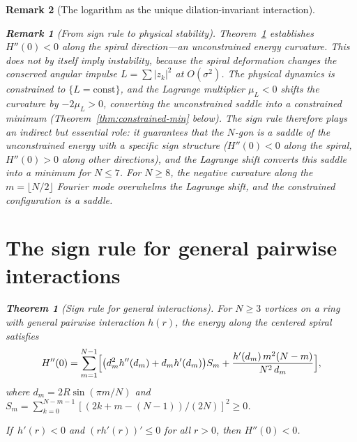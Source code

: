 \documentclass[12pt, a4paper]{article}
\newtheorem{theorem}{Theorem}[section]
\newtheorem{remark}{Remark}[section]
\numberwithin{equation}{section}
\begin{document}
\begin{remark}[The logarithm as the unique dilation-invariant interaction]
\begin{remark}[From sign rule to physical stability]
\label{rem:signrule-to-stability}
Theorem~\ref{thm:sign-rule} establishes $H''(0) < 0$ along the spiral
direction---an \emph{unconstrained} energy curvature.  This does not by
itself imply instability, because the spiral deformation changes the
conserved angular impulse $L = \sum|z_k|^2$ at $O(\sigma^2)$.  The
physical dynamics is constrained to $\{L = \mathrm{const}\}$, and
the Lagrange multiplier $\mu_L < 0$ shifts the curvature by
$-2\mu_L > 0$, converting the unconstrained saddle into a
\emph{constrained minimum} (Theorem~\ref{thm:constrained-min} below).
The sign rule therefore plays an indirect but essential role: it
guarantees that the $N$-gon is a saddle of the unconstrained energy
with a specific sign structure ($H''(0) < 0$ along the spiral,
$H''(0) > 0$ along other directions), and the Lagrange shift converts
this saddle into a minimum for $N \le 7$.  For $N \ge 8$, the negative
curvature along the $m = \lfloor N/2\rfloor$ Fourier mode overwhelms
the Lagrange shift, and the constrained configuration is a saddle.
\end{remark}


\section{The sign rule for general pairwise interactions}
\label{sec:sign-rule}

\begin{theorem}[Sign rule for general interactions]\label{thm:sign-rule}
For $N \ge 3$ vortices on a ring with general pairwise interaction
$h(r)$, the energy along the centered spiral satisfies
\begin{equation}\label{eq:Hpp-general}
  H''(0) = \sum_{m=1}^{N-1}\Bigl[
    \bigl(d_m^2 h''(d_m) + d_m h'(d_m)\bigr) S_m
    + \frac{h'(d_m)\, m^2(N-m)}{N^2\, d_m}
  \Bigr],
\end{equation}
where $d_m = 2R\sin(\pi m/N)$ and
$S_m = \sum_{k=0}^{N-m-1}[(2k+m-(N{-}1))/(2N)]^2 \ge 0$.

If\, $h'(r) < 0$ and $(rh'(r))' \le 0$ for all $r > 0$, then
$H''(0) < 0$.
\end{theorem}


\end{remark}
\end{document}
